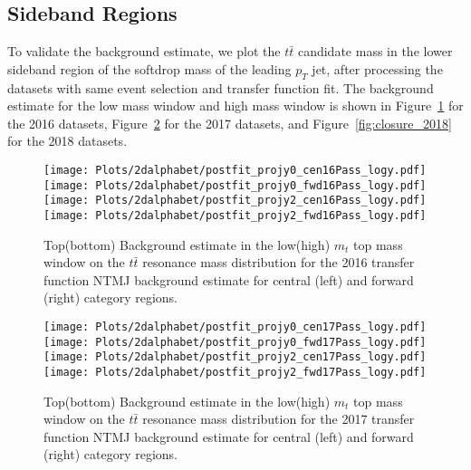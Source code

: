 %
%
%

\subsection{Sideband Regions}

To validate the background estimate, we plot the $t\bar{t}$ candidate mass in the lower sideband region of the softdrop mass of the leading $p_T$ jet, after processing the datasets with same event selection and transfer function fit. The background estimate for the low mass window and high mass window is shown in Figure~\ref{fig:closure_2016} for the 2016 datasets, Figure~\ref{fig:closure_2017} for the 2017 datasets, and Figure~\ref{fig:closure_2018} for the 2018 datasets. 




\begin{figure}[!htbp]
	\begin{center}
		\texttt{[image: Plots/2dalphabet/postfit\_projy0\_cen16Pass\_logy.pdf]}
		\texttt{[image: Plots/2dalphabet/postfit\_projy0\_fwd16Pass\_logy.pdf]}\\
		\texttt{[image: Plots/2dalphabet/postfit\_projy2\_cen16Pass\_logy.pdf]}
		\texttt{[image: Plots/2dalphabet/postfit\_projy2\_fwd16Pass\_logy.pdf]}\\

		\caption{Top(bottom) Background estimate in the low(high) $m_{t}$ top mass window on the $t\bar{t}$ resonance mass distribution for the 2016 transfer function NTMJ background estimate for central (left) and forward (right) category regions.}
		\label{fig:closure_2016}
	\end{center}
\end{figure}


\begin{figure}[!htbp]
	\begin{center}
		\texttt{[image: Plots/2dalphabet/postfit\_projy0\_cen17Pass\_logy.pdf]}
		\texttt{[image: Plots/2dalphabet/postfit\_projy0\_fwd17Pass\_logy.pdf]}\\
		\texttt{[image: Plots/2dalphabet/postfit\_projy2\_cen17Pass\_logy.pdf]}
		\texttt{[image: Plots/2dalphabet/postfit\_projy2\_fwd17Pass\_logy.pdf]}\\
		
		\caption{Top(bottom) Background estimate in the low(high) $m_{t}$ top mass window on the $t\bar{t}$ resonance mass distribution for the 2017 transfer function NTMJ background estimate for central (left) and forward (right) category regions.}
		\label{fig:closure_2017}
	\end{center}
\end{figure}


